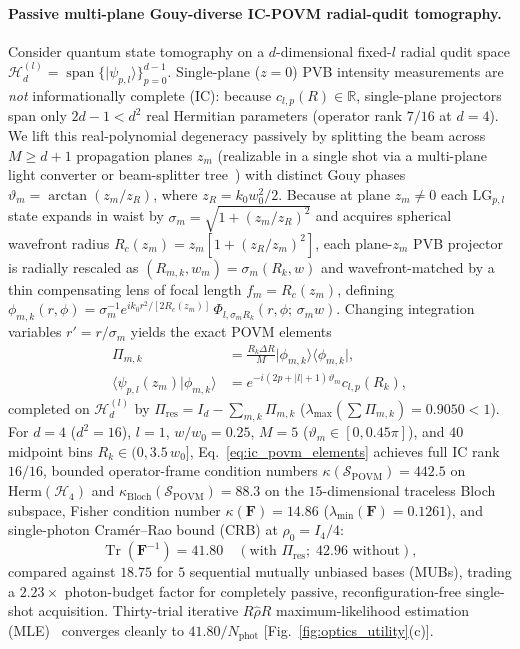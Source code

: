 \documentclass[aps,pra,reprint,amsmath,amssymb,floatfix,longbibliography]{revtex4-2}
\providecommand{\bra}[1]{\langle#1\rvert}
\providecommand{\ket}[1]{\lvert#1\rangle}
\providecommand{\braket}[2]{\langle#1\vert#2\rangle}
\providecommand{\abs}[1]{\lvert#1\rvert}
\begin{document}
\paragraph*{Passive multi-plane Gouy-diverse IC-POVM radial-qudit tomography.}
Consider quantum state tomography on a $d$-dimensional fixed-$l$ radial qudit space $\mathcal{H}_d^{(l)} = \operatorname{span}\{\ket{\psi_{p,l}}\}_{p=0}^{d-1}$. Single-plane ($z = 0$) PVB intensity measurements are \emph{not} informationally complete (IC): because $c_{l,p}(R) \in \mathbb{R}$, single-plane projectors span only $2d - 1 < d^2$ real Hermitian parameters (operator rank $7/16$ at $d = 4$). We lift this real-polynomial degeneracy passively by splitting the beam across $M \ge d+1$ propagation planes $z_m$ (realizable in a single shot via a multi-plane light converter or beam-splitter tree~\cite{Fontaine2019,Bouchard2018}) with distinct Gouy phases $\vartheta_m = \arctan(z_m/z_R)$, where $z_R = k_0 w_0^2/2$. Because at plane $z_m \neq 0$ each $\mathrm{LG}_{p,l}$ state expands in waist by $\sigma_m = \sqrt{1 + (z_m/z_R)^2}$ and acquires spherical wavefront radius $R_c(z_m) = z_m[1 + (z_R/z_m)^2]$, each plane-$z_m$ PVB projector is radially rescaled as $(R_{m,k}, w_m) = \sigma_m(R_k, w)$ and wavefront-matched by a thin compensating lens of focal length $f_m = R_c(z_m)$, defining $\phi_{m,k}(r,\phi) = \sigma_m^{-1} e^{ik_0 r^2/[2R_c(z_m)]}\,\Phi_{l,\sigma_m R_k}(r,\phi;\,\sigma_m w)$. Changing integration variables $r' = r/\sigma_m$ yields the exact POVM elements~\cite{Renes2004}
\begin{align}
\Pi_{m,k} &= \frac{R_k \Delta R}{M}\ket{\phi_{m,k}}\bra{\phi_{m,k}}, \nonumber \\
\braket{\psi_{p,l}(z_m)}{\phi_{m,k}} &= e^{-i(2p+\abs{l}+1)\vartheta_m} c_{l,p}(R_k),
\label{eq:ic_povm_elements}
\end{align}
completed on $\mathcal{H}_d^{(l)}$ by $\Pi_{\mathrm{res}} = I_d - \sum_{m,k}\Pi_{m,k}$ ($\lambda_{\max}(\sum \Pi_{m,k}) = 0.9050 < 1$). For $d = 4$ ($d^2 = 16$), $l = 1$, $w/w_0 = 0.25$, $M = 5$ ($\vartheta_m \in [0, 0.45\pi]$), and $40$ midpoint bins $R_k \in (0, 3.5\,w_0]$, Eq.~\eqref{eq:ic_povm_elements} achieves full IC rank $16/16$, bounded operator-frame condition numbers $\kappa(\mathcal{S}_{\mathrm{POVM}}) = 442.5$ on $\mathrm{Herm}(\mathcal{H}_4)$ and $\kappa_{\mathrm{Bloch}}(\mathcal{S}_{\mathrm{POVM}}) = 88.3$ on the $15$-dimensional traceless Bloch subspace, Fisher condition number $\kappa(\mathbf{F}) = 14.86$ ($\lambda_{\min}(\mathbf{F}) = 0.1261$), and single-photon Cram\'er--Rao bound (CRB) at $\rho_0 = I_4/4$:
\begin{equation}
\operatorname{Tr}\!\left(\mathbf{F}^{-1}\right) = 41.80 \quad (\text{with }\Pi_{\mathrm{res}};\; 42.96\text{ without}),
\label{eq:fisher_crb}
\end{equation}
compared against $18.75$ for $5$ sequential mutually unbiased bases (MUBs), trading a $2.23\times$ photon-budget factor for completely passive, reconfiguration-free single-shot acquisition. Thirty-trial iterative $R\hat{\rho}R$ maximum-likelihood estimation (MLE)~\cite{Lvovsky2004} converges cleanly to $41.80/N_{\mathrm{phot}}$ [Fig.~\ref{fig:optics_utility}(c)].
\end{document}
